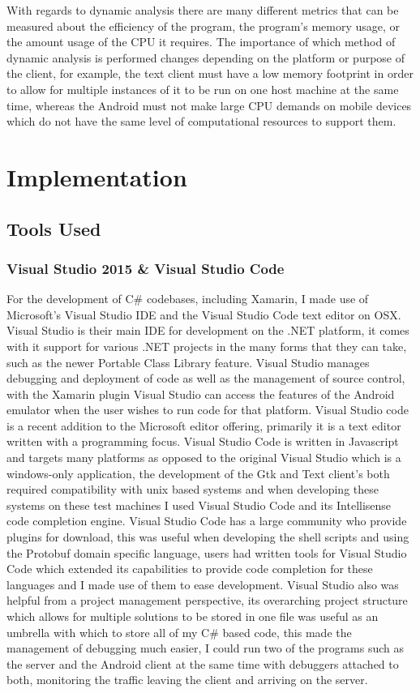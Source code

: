 \documentclass{article}
\begin{document}
With regards to dynamic analysis there are many different metrics that can be measured about the efficiency of the program, the program's memory usage, or the amount usage of the CPU it requires. The importance of which method of dynamic analysis is performed changes depending on the platform or purpose of the client, for example, the text client must have a low memory footprint in order to allow for multiple instances of it to be run on one host machine at the same time, whereas the Android must not make large CPU demands on mobile devices which do not have the same level of computational resources to support them. 

\section{Implementation}
\subsection{Tools Used}

\subsubsection{Visual Studio 2015 \& Visual Studio Code}
For the development of C\# codebases, including Xamarin, I made use of Microsoft’s Visual Studio IDE and the Visual Studio Code text editor on OSX. Visual Studio is their main IDE for development on the .NET platform, it comes with it support for various .NET projects in the many forms that they can take, such as the newer Portable Class Library feature. Visual Studio manages debugging and deployment of code as well as the management of source control, with the Xamarin plugin Visual Studio can access the features of the Android emulator when the user wishes to run code for that platform. Visual Studio code is a recent addition to the Microsoft editor offering, primarily it is a text editor written with a programming focus. Visual Studio Code is written in Javascript and targets many platforms as opposed to the original Visual Studio which is a windows-only application, the development of the Gtk and Text client’s both required compatibility with unix based systems and when developing these systems on these test machines I used Visual Studio Code and its Intellisense code completion engine. Visual Studio Code has a large community who provide plugins for download, this was useful when developing the shell scripts and using the Protobuf domain specific language, users had written tools for Visual Studio Code which extended its capabilities to provide code completion for these languages and I made use of them to ease development. Visual Studio also was helpful from a project management perspective, its overarching project structure which allows for multiple solutions to be stored in one file was useful as an umbrella with which to store all of my C\# based code, this made the management of debugging much easier, I could run two of the programs such as the server and the Android client at the same time with debuggers attached to both, monitoring the traffic leaving the client and arriving on the server.
\end{document}
